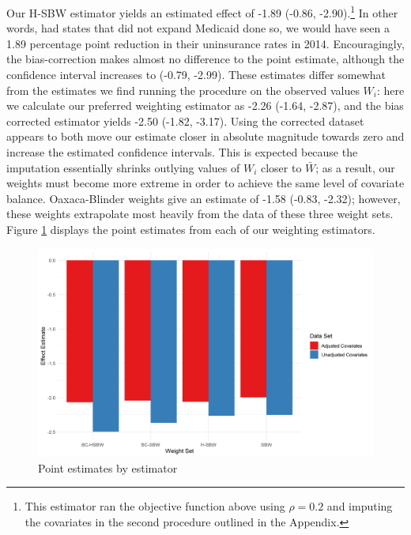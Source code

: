 \documentclass[12pt]{article}
\begin{document}
Our H-SBW estimator yields an estimated effect of -1.89 (-0.86, -2.90).\footnote{This estimator ran the objective function above using $\rho = 0.2$ and imputing the covariates in the second procedure outlined in the Appendix.} In other words, had states that did not expand Medicaid done so, we would have seen a 1.89 percentage point reduction in their uninsurance rates in 2014. Encouragingly, the bias-correction makes almost no difference to the point estimate, although the confidence interval increases to (-0.79, -2.99). These estimates differ somewhat from the estimates we find running the procedure on the observed values $W_i$: here we calculate our preferred weighting estimator as -2.26 (-1.64, -2.87), and the bias corrected estimator yields -2.50 (-1.82, -3.17). Using the corrected dataset appears to both move our estimate closer in absolute magnitude towards zero and increase the estimated confidence intervals. This is expected because the imputation essentially shrinks outlying values of $W_i$ closer to $\bar{W}$; as a result, our weights must become more extreme in order to achieve the same level of covariate balance. Oaxaca-Blinder weights give an estimate of -1.58 (-0.83, -2.32); however, these weights extrapolate most heavily from the data of these three weight sets. Figure \ref{estimators} displays the point estimates from each of our weighting estimators. 

\begin{figure}[B]
\begin{center}
    \includegraphics[scale=0.6]{01_Plots/point-estimates-c1.png}
    \caption{Point estimates by estimator}
    \label{estimators}
\end{center}
\end{figure}
\end{document}
